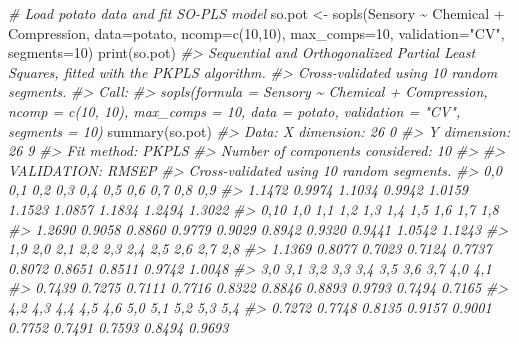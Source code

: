 \documentclass[
]{article}
\newenvironment{Shaded}{\begin{snugshade}}{\end{snugshade}}
\newcommand{\AttributeTok}[1]{\textcolor[rgb]{0.77,0.63,0.00}{#1}}
\newcommand{\CommentTok}[1]{\textcolor[rgb]{0.56,0.35,0.01}{\textit{#1}}}
\newcommand{\DecValTok}[1]{\textcolor[rgb]{0.00,0.00,0.81}{#1}}
\newcommand{\FunctionTok}[1]{\textcolor[rgb]{0.00,0.00,0.00}{#1}}
\newcommand{\NormalTok}[1]{#1}
\newcommand{\OtherTok}[1]{\textcolor[rgb]{0.56,0.35,0.01}{#1}}
\newcommand{\SpecialCharTok}[1]{\textcolor[rgb]{0.00,0.00,0.00}{#1}}
\newcommand{\StringTok}[1]{\textcolor[rgb]{0.31,0.60,0.02}{#1}}
\begin{document}
\begin{Shaded}
\begin{Highlighting}[]
\CommentTok{\# Load potato data and fit SO{-}PLS model}
\NormalTok{so.pot }\OtherTok{\textless{}{-}} \FunctionTok{sopls}\NormalTok{(Sensory }\SpecialCharTok{\textasciitilde{}}\NormalTok{ Chemical }\SpecialCharTok{+}\NormalTok{ Compression, }\AttributeTok{data=}\NormalTok{potato, }
            \AttributeTok{ncomp=}\FunctionTok{c}\NormalTok{(}\DecValTok{10}\NormalTok{,}\DecValTok{10}\NormalTok{), }\AttributeTok{max\_comps=}\DecValTok{10}\NormalTok{, }\AttributeTok{validation=}\StringTok{"CV"}\NormalTok{, }\AttributeTok{segments=}\DecValTok{10}\NormalTok{)}
\FunctionTok{print}\NormalTok{(so.pot)}
\CommentTok{\#\textgreater{} Sequential and Orthogonalized Partial Least Squares, fitted with the PKPLS algorithm.}
\CommentTok{\#\textgreater{} Cross{-}validated using 10 random segments.}
\CommentTok{\#\textgreater{} Call:}
\CommentTok{\#\textgreater{} sopls(formula = Sensory \textasciitilde{} Chemical + Compression, ncomp = c(10,     10), max\_comps = 10, data = potato, validation = "CV", segments = 10)}
\FunctionTok{summary}\NormalTok{(so.pot)}
\CommentTok{\#\textgreater{} Data:    X dimension: 26 0 }
\CommentTok{\#\textgreater{}  Y dimension: 26 9}
\CommentTok{\#\textgreater{} Fit method: PKPLS}
\CommentTok{\#\textgreater{} Number of components considered: 10}
\CommentTok{\#\textgreater{} }
\CommentTok{\#\textgreater{} VALIDATION: RMSEP}
\CommentTok{\#\textgreater{} Cross{-}validated using 10 random segments.}
\CommentTok{\#\textgreater{}    0,0     0,1     0,2     0,3     0,4     0,5     0,6     0,7     0,8     0,9  }
\CommentTok{\#\textgreater{} 1.1472  0.9974  1.1034  0.9942  1.0159  1.1523  1.0857  1.1834  1.2494  1.3022  }
\CommentTok{\#\textgreater{}   0,10     1,0     1,1     1,2     1,3     1,4     1,5     1,6     1,7     1,8  }
\CommentTok{\#\textgreater{} 1.2690  0.9058  0.8860  0.9779  0.9029  0.8942  0.9320  0.9441  1.0542  1.1243  }
\CommentTok{\#\textgreater{}    1,9     2,0     2,1     2,2     2,3     2,4     2,5     2,6     2,7     2,8  }
\CommentTok{\#\textgreater{} 1.1369  0.8077  0.7023  0.7124  0.7737  0.8072  0.8651  0.8511  0.9742  1.0048  }
\CommentTok{\#\textgreater{}    3,0     3,1     3,2     3,3     3,4     3,5     3,6     3,7     4,0     4,1  }
\CommentTok{\#\textgreater{} 0.7439  0.7275  0.7111  0.7716  0.8322  0.8846  0.8893  0.9793  0.7494  0.7165  }
\CommentTok{\#\textgreater{}    4,2     4,3     4,4     4,5     4,6     5,0     5,1     5,2     5,3     5,4  }
\CommentTok{\#\textgreater{} 0.7272  0.7748  0.8135  0.9157  0.9001  0.7752  0.7491  0.7593  0.8494  0.9693  }

\end{Highlighting}
\end{Shaded}
\end{document}
